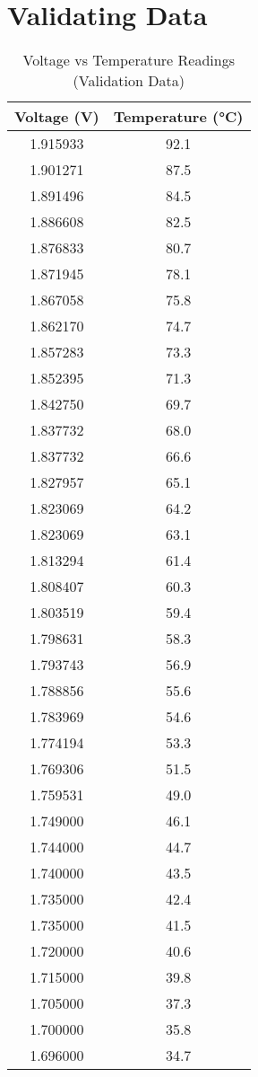 \documentclass[a4paper,12pt]{article}
\begin{document}
\section*{Validating Data}

\begin{table}[htbp]
\centering
\caption{Voltage vs Temperature Readings (Validation Data)}
\renewcommand{\arraystretch}{0.9}
\small
\begin{tabular}{|c|c|}
\hline
\textbf{Voltage (V)} & \textbf{Temperature (°C)} \\ \hline
1.915933 & 92.1 \\ \hline
1.901271 & 87.5 \\ \hline
1.891496 & 84.5 \\ \hline
1.886608 & 82.5 \\ \hline
1.876833 & 80.7 \\ \hline
1.871945 & 78.1 \\ \hline
1.867058 & 75.8 \\ \hline
1.862170 & 74.7 \\ \hline
1.857283 & 73.3 \\ \hline
1.852395 & 71.3 \\ \hline
1.842750 & 69.7 \\ \hline
1.837732 & 68.0 \\ \hline
1.837732 & 66.6 \\ \hline
1.827957 & 65.1 \\ \hline
1.823069 & 64.2 \\ \hline
1.823069 & 63.1 \\ \hline
1.813294 & 61.4 \\ \hline
1.808407 & 60.3 \\ \hline
1.803519 & 59.4 \\ \hline
1.798631 & 58.3 \\ \hline
1.793743 & 56.9 \\ \hline
1.788856 & 55.6 \\ \hline
1.783969 & 54.6 \\ \hline
1.774194 & 53.3 \\ \hline
1.769306 & 51.5 \\ \hline
1.759531 & 49.0 \\ \hline
1.749000 & 46.1 \\ \hline
1.744000 & 44.7 \\ \hline
1.740000 & 43.5 \\ \hline
1.735000 & 42.4 \\ \hline
1.735000 & 41.5 \\ \hline
1.720000 & 40.6 \\ \hline
1.715000 & 39.8 \\ \hline
1.705000 & 37.3 \\ \hline
1.700000 & 35.8 \\ \hline
1.696000 & 34.7 \\ \hline
\end{tabular}
\end{table}
\end{document}
